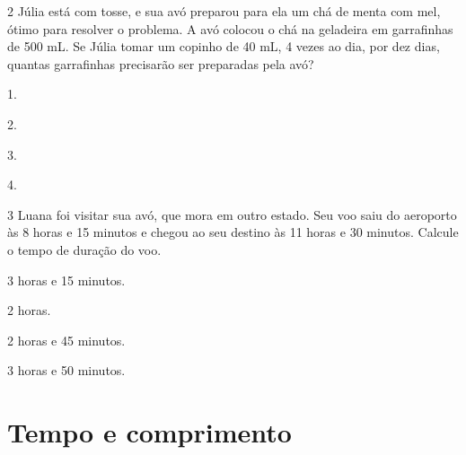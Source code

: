 \num{2} Júlia está com tosse, e sua avó preparou para ela um chá de menta com mel, ótimo para resolver o problema. A avó colocou o chá na geladeira em garrafinhas de 500 mL. Se Júlia tomar um copinho de 40 mL, 4 vezes ao dia, por dez dias, quantas garrafinhas precisarão ser preparadas pela avó?

\begin{escolha}
\begin{multicols}{2}

\item 1.

\item 2.
\end{multicols}


\begin{multicols}{2}

\item 3.

\item 4.
\end{multicols}
\end{escolha}


\num{3} Luana foi visitar sua avó, que mora em outro estado. Seu voo
saiu do aeroporto às 8 horas e 15 minutos e chegou ao seu destino às 11
horas e 30 minutos. Calcule o tempo de duração do voo.

\begin{escolha}
\begin{multicols}{2}

\item 3 horas e 15 minutos.

\item 2 horas.
\end{multicols}


\begin{multicols}{2}

\item 2 horas e 45 minutos.

\item 3 horas e 50 minutos.
\end{multicols}  
\end{escolha}

\chapter{Tempo e comprimento}
\enlargethispage{6\baselineskip}

